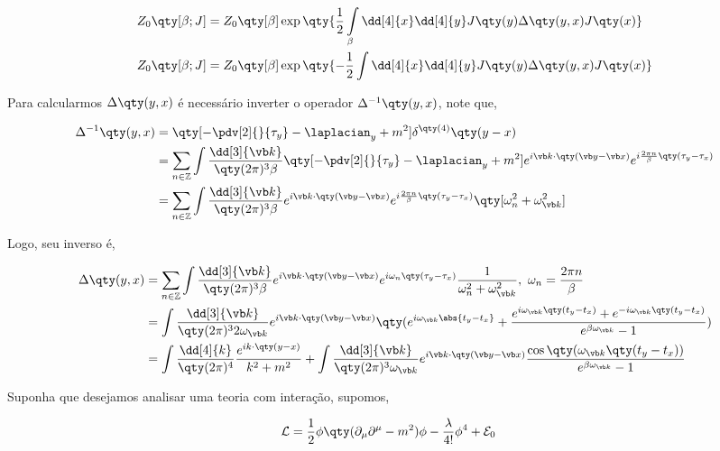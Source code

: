 \documentclass[twoside]{amsart}
\numberwithin{equation}{section}
\begin{document}
\begin{refsection}
\begin{align}
    Z_0\qty[\beta; J]&=Z_0\qty[\beta]\exp\qty{\frac12\int\limits_{\beta}\dd[4]{x}\dd[4]{y}J\qty(y)\Delta\qty(y,x)J\qty(x)}\\
    Z_0\qty[\beta; J]&=Z_0\qty[\beta]\exp\qty{-\frac12\int\limits\dd[4]{x}\dd[4]{y}J\qty(y)\Delta\qty(y,x)J\qty(x)}
\end{align}

Para calcularmos $\Delta\qty(y,x)$ é necessário inverter o operador $\Delta^{-1}\qty(y,x)$, note que,

\begin{align}
    \Delta^{-1}\qty(y,x)&=\qty[-\pdv[2]{}{\tau_y}-\laplacian_y+m^2]\delta^{\qty(4)}\qty(y-x)\\
    &=\sum\limits_{n\in\mathbb Z}\int\frac{\dd[3]{\vb k}}{\qty(2\pi)^3\beta}\qty[-\pdv[2]{}{\tau_y}-\laplacian_y+m^2]e^{i\vb k\cdot\qty(\vb y-\vb x)}e^{i\frac{2\pi n}{\beta}\qty(\tau_y-\tau_x)}\\
    &=\sum\limits_{n\in\mathbb Z}\int\frac{\dd[3]{\vb k}}{\qty(2\pi)^3\beta}e^{i\vb k\cdot\qty(\vb y-\vb x)}e^{i\frac{2\pi n}{\beta}\qty(\tau_y-\tau_x)}\qty[\omega_n^2+\omega_{\vb k}^2]
\end{align}

Logo, seu inverso é,

\begin{align}
    \Delta\qty(y,x)&=\sum\limits_{n\in\mathbb Z}\int\frac{\dd[3]{\vb k}}{\qty(2\pi)^3\beta}e^{i\vb k\cdot\qty(\vb y-\vb x)}e^{i\omega_n\qty(\tau_y-\tau_x)}\frac{1}{\omega_n^2+\omega_{\vb k}^2},\ \omega_n=\frac{2\pi n}{\beta}\\
    &=\int\frac{\dd[3]{\vb k}}{\qty(2\pi)^32\omega_{\vb k}}e^{i\vb k\cdot\qty(\vb y-\vb x)}\qty(e^{i\omega_{\vb k}\abs{t_y-t_x}}+\frac{e^{i\omega_{\vb k}\qty(t_y-t_x)}+e^{-i\omega_{\vb k}\qty(t_y-t_x)}}{e^{\beta\omega_{\vb k}}-1})\\
    &=\int\frac{\dd[4]{ k}}{\qty(2\pi)^4}\frac{e^{i k\cdot\qty( y- x)}}{k^2+m^2}+\int\frac{\dd[3]{\vb k}}{\qty(2\pi)^3\omega_{\vb k}}e^{i\vb k\cdot\qty(\vb y-\vb x)}\frac{\cos\qty(\omega_{\vb k}\qty(t_y-t_x))}{e^{\beta\omega_{\vb k}}-1}
\end{align}

Suponha que desejamos analisar uma teoria com interação, supomos,

\begin{align}
    \mathcal L&=\frac12\phi\qty(\partial_\mu\partial^\mu-m^2)\phi-\frac{\lambda}{4!}\phi^4+\mathcal E_0
\end{align}


\end{refsection}
\end{document}
